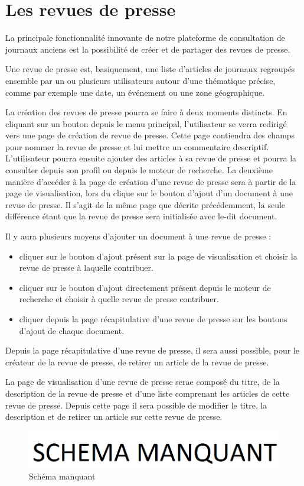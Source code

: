 \section{Les revues de presse}
\label{sec:revue}

La principale fonctionnalité innovante de notre plateforme de consultation de journaux anciens est la possibilité de
créer et de partager des revues de presse.

Une revue de presse est, basiquement, une liste d'articles de journaux regroupés ensemble par un ou plusieurs utilisateurs autour d'une thématique précise,
comme par exemple une date, un événement ou une zone géographique.

La création des revues de presse pourra se faire à deux moments distincts. En cliquant sur un bouton depuis le menu principal, l'utilisateur se verra redirigé vers une page de création de revue de presse. Cette page contiendra des champs pour nommer la revue de presse et lui mettre un commentaire descriptif. L'utilisateur pourra ensuite ajouter des articles à sa revue de presse et pourra la consulter depuis son profil ou depuis le moteur de recherche. La deuxième manière d'accéder à la page de création d'une revue de presse sera à partir de la page de visualisation, lors du clique sur le bouton d'ajout d'un document à une revue de presse. Il s'agit de la même page que décrite précédemment,
la seule différence étant que la revue de presse sera initialisée avec le-dit document.

Il y aura plusieurs moyens d'ajouter un document à une revue de presse :  

\begin{itemize}
  \item cliquer sur le bouton d'ajout présent sur la page de visualisation et choisir la
revue de presse à laquelle contribuer.
  \item cliquer sur le bouton d'ajout directement présent depuis le moteur de recherche et choisir
à quelle revue de presse contribuer.
  \item cliquer depuis la page récapitulative d'une revue de presse sur les boutons d'ajout de chaque document.
\end{itemize}
Depuis la page récapitulative d'une revue de presse, il sera aussi possible, pour le créateur de la revue de presse, de retirer un article de
la revue de presse.

La page de visualisation d'une revue de presse serae composé du titre, de la description de la revue de presse et d'une liste comprenant les articles
de cette revue de presse. Depuis cette page il sera possible de modifier le titre, la description et de retirer un article sur cette revue de presse.

    \begin{figure}[H]
        \centering
        \includegraphics[width=\textwidth]{figures/manquant.png}
            \caption{Schéma manquant}
            \label{fig:manquant}
    \end{figure}